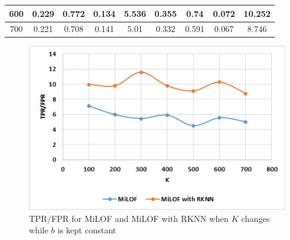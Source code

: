 \begin{table}[H]
\begin{tabular}{|c|c|c|c|c|c|c|c|c|}
		600                       & 0.229                          & 0.772                              & 0.134                    & 5.536                        & 0.355                          & 0.74                               & 0.072                    & 10.252                       \\ \hline
		700                       & 0.221                          & 0.708                              & 0.141                    & 5.01                         & 0.332                          & 0.591                              & 0.067                    & 8.746                        \\ \hline
	\end{tabular}
\end{table}

\begin{figure}[H]
	\centering
	\includegraphics{chap04/varyK.png}
	\caption{TPR/FPR for MiLOF and MiLOF with RKNN when $K$ changes while $b$ is kept constant }
\end{figure}


